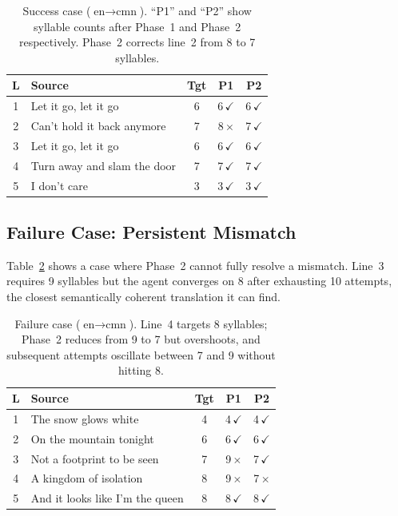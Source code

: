 \documentclass[11pt]{article}
\begin{document}
\begin{table}[h]
\centering
\small
\begin{tabular}{@{}clccc@{}}
\toprule
\textbf{L} & \textbf{Source} & \textbf{Tgt} & \textbf{P1} & \textbf{P2} \\
\midrule
1 & Let it go, let it go & 6 & 6\,$\checkmark$ & 6\,$\checkmark$ \\
2 & Can't hold it back anymore & 7 & 8\,$\times$ & 7\,$\checkmark$ \\
3 & Let it go, let it go & 6 & 6\,$\checkmark$ & 6\,$\checkmark$ \\
4 & Turn away and slam the door & 7 & 7\,$\checkmark$ & 7\,$\checkmark$ \\
5 & I don't care & 3 & 3\,$\checkmark$ & 3\,$\checkmark$ \\
\bottomrule
\end{tabular}
\caption{Success case ($\text{en} \rightarrow \text{cmn}$). ``P1'' and ``P2'' show syllable counts after Phase~1 and Phase~2 respectively. Phase~2 corrects line~2 from 8 to 7 syllables.}
\label{tab:ex-success}
\end{table}

\subsection{Failure Case: Persistent Mismatch}

Table~\ref{tab:ex-failure} shows a case where Phase~2 cannot fully resolve a mismatch.
Line~3 requires 9 syllables but the agent converges on 8 after exhausting 10 attempts, the closest semantically coherent translation it can find.

\begin{table}[h]
\centering
\small
\begin{tabular}{@{}clccc@{}}
\toprule
\textbf{L} & \textbf{Source} & \textbf{Tgt} & \textbf{P1} & \textbf{P2} \\
\midrule
1 & The snow glows white & 4 & 4\,$\checkmark$ & 4\,$\checkmark$ \\
2 & On the mountain tonight & 6 & 6\,$\checkmark$ & 6\,$\checkmark$ \\
3 & Not a footprint to be seen & 7 & 9\,$\times$ & 7\,$\checkmark$ \\
4 & A kingdom of isolation & 8 & 9\,$\times$ & 7\,$\times$ \\
5 & And it looks like I'm the queen & 8 & 8\,$\checkmark$ & 8\,$\checkmark$ \\
\bottomrule
\end{tabular}
\caption{Failure case ($\text{en} \rightarrow \text{cmn}$). Line~4 targets 8 syllables; Phase~2 reduces from 9 to 7 but overshoots, and subsequent attempts oscillate between 7 and 9 without hitting 8.}
\label{tab:ex-failure}
\end{table}
\end{document}
